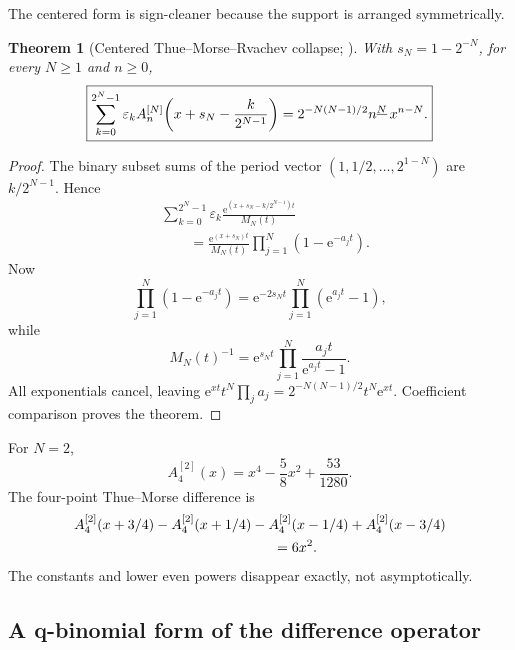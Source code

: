 \documentclass[11pt,oneside]{article}
\numberwithin{equation}{section}
\newtheorem{theorem}{Theorem}[section]
\theoremstyle{definition}
\theoremstyle{remark}
\newcommand{\e}{\mathrm e}
\newcommand{\eps}{\varepsilon}
\begin{document}
The centered form is sign-cleaner because the support is arranged symmetrically.

\begin{theorem}[Centered Thue--Morse--Rvachev collapse; \statusnew]
\label{p2:thm:TM-centered}
With $s_N=1-2^{-N}$, for every $N\ge1$ and $n\ge0$,
\begin{equation}
 \boxed{
 \sum_{k=0}^{2^N-1}\eps_k
 A_n^{[N]}\!\left(x+s_N-\frac{k}{2^{N-1}}\right)
 =2^{-N(N-1)/2}\fall nN\,x^{n-N}.
 }
 \label{p2:eq:TM-A-collapse}
\end{equation}
\end{theorem}

\begin{proof}
The binary subset sums of the period vector
$(1,1/2,\ldots,2^{1-N})$ are $k/2^{N-1}$.  Hence
\begin{align*}
 &\sum_{k=0}^{2^N-1}\eps_k
 \frac{\e^{(x+s_N-k/2^{N-1})t}}{M_N(t)}\\
 &\qquad=
 \frac{\e^{(x+s_N)t}}{M_N(t)}
 \prod_{j=1}^{N}(1-\e^{-a_jt}).
\end{align*}
Now
\[
 \prod_{j=1}^{N}(1-\e^{-a_jt})
 =\e^{-2s_Nt}\prod_{j=1}^{N}(\e^{a_jt}-1),
\]
while
\[
 M_N(t)^{-1}=\e^{s_Nt}\prod_{j=1}^{N}\frac{a_jt}{\e^{a_jt}-1}.
\]
All exponentials cancel, leaving
$\e^{xt}t^N\prod_ja_j=2^{-N(N-1)/2}t^N\e^{xt}$.  Coefficient comparison proves the theorem.
\end{proof}

\begin{example}
For $N=2$,
\begin{equation}
 A_4^{[2]}(x)=x^4-\frac58x^2+\frac{53}{1280}.
 \label{p2:eq:A4N2}
\end{equation}
The four-point Thue--Morse difference is
\begin{align}
 &A_4^{[2]}(x+3/4)-A_4^{[2]}(x+1/4)
 -A_4^{[2]}(x-1/4)+A_4^{[2]}(x-3/4)
 \notag\\
 &\hspace{5cm}=6x^2.
 \label{p2:eq:A4N2-example}
\end{align}
The constants and lower even powers disappear exactly, not asymptotically.
\end{example}

\subsection{A q-binomial form of the difference operator}
\end{document}
